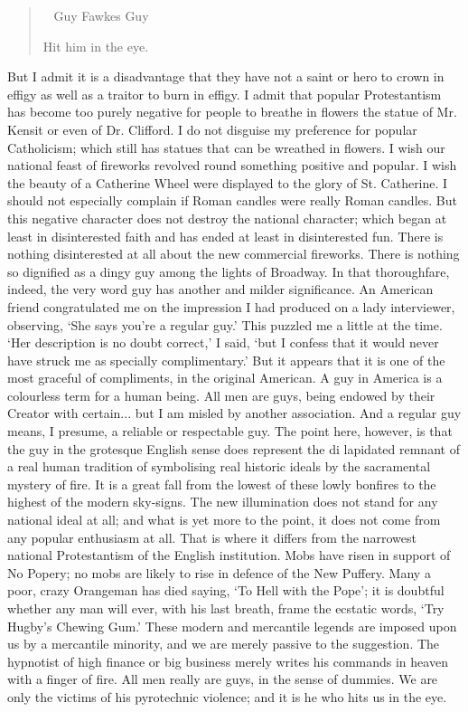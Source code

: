 \documentclass{book}
\newenvironment{mdblockquote}{%
  \begin{quotation}
    \
}{%
  \end{quotation}
}
\begin{document}
\begin{mdblockquote}
	Guy Fawkes Guy

	Hit him in the eye.


\end{mdblockquote}
But I admit it is a disadvantage that they have not a saint or hero to crown in effigy as well as a traitor to burn in effigy. I admit that popular Protestantism has become too purely negative for people to breathe in flowers the statue of Mr. Kensit or even of Dr. Clifford. I do not disguise my preference for popular Catholicism; which still has statues that can be wreathed in flowers. I wish our national feast of fireworks revolved round something positive and popular. I wish the beauty of a Catherine Wheel were displayed to the glory of St. Catherine. I should not especially complain if Roman candles were really Roman candles. But this negative character does not destroy the national character; which began at least in disinterested faith and has ended at least in disinterested fun. There is nothing disinterested at all about the new commercial fireworks. There is nothing so dignified as a dingy guy among the lights of Broadway. In that thoroughfare, indeed, the very word guy has another and milder significance. An American friend congratulated me on the impression I had produced on a lady interviewer, observing, ‘She says you’re a regular guy.’ This puzzled me a little at the time. ‘Her description is no doubt correct,’ I said, ‘but I confess that it would never have struck me as specially complimentary.’ But it appears that it is one of the most graceful of compliments, in the original American. A guy in America is a colourless term for a human being. All men are guys, being endowed by their Creator with certain... but I am misled by another association. And a regular guy means, I presume, a reliable or respectable guy. The point here, however, is that the guy in the grotesque English sense does represent the di lapidated remnant of a real human tradition of symbolising real historic ideals by the sacramental mystery of fire. It is a great fall from the lowest of these lowly bonfires to the highest of the modern sky-signs. The new illumination does not stand for any national ideal at all; and what is yet more to the point, it does not come from any popular enthusiasm at all. That is where it differs from the narrowest national Protestantism of the English institution. Mobs have risen in support of No Popery; no mobs are likely to rise in defence of the New Puffery. Many a poor, crazy Orangeman has died saying, ‘To Hell with the Pope’; it is doubtful whether any man will ever, with his last breath, frame the ecstatic words, ‘Try Hugby’s Chewing Gum.’ These modern and mercantile legends are imposed upon us by a mercantile minority, and we are merely passive to the suggestion. The hypnotist of high finance or big business merely writes his commands in heaven with a finger of fire. All men really are guys, in the sense of dummies. We are only the victims of his pyrotechnic violence; and it is he who hits us in the eye.
\end{document}
